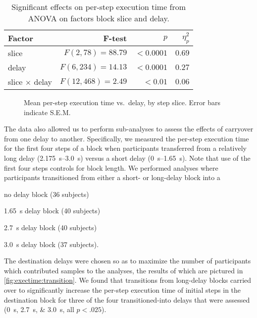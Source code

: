 \documentclass[10pt,letterpaper]{article}
\begin{document}
\begin{table}[h]
  \centering
  \caption{Significant effects on per-step execution time from ANOVA on factors block slice and delay.}\label{tab:anova:exectime:slice}
  \setlength{\tabcolsep}{0pt} %
  \begin{tabular*}{\columnwidth}{@{\extracolsep{\fill}\quad}lrrr@{}}
    \toprule
    \textbf{Factor} & \textbf{F-test} & \( p \) & \( \eta^{2}_{p} \) \\
    \midrule
    slice         &   \( F(2, 78) = 88.79 \) &  \( < 0.0001 \) &         \( 0.69 \) \\
    delay         &  \( F(6, 234) = 14.13 \) &  \( < 0.0001 \) &         \( 0.27 \) \\
    slice \( \times \) delay &  \( F(12, 468) = 2.49 \) &    \( < 0.01 \) &         \( 0.06 \) \\
    \bottomrule
  \end{tabular*}%
\end{table}

\begin{figure}[h]
    \centering
    \caption{Mean per-step execution time vs.\ delay, by step slice.
    Error bars indicate S.E.M.}
    \label{fig:exectime:delay:slice}
\end{figure}

The data also allowed us to perform sub-analyses to assess the effects of carryover from one delay to another.
Specifically, we measured the per-step execution time for the first four steps of a block when participants transferred from a relatively long delay (\SIrange{2.175}{3.0}{\second}) versus a short delay (\SIrange{0}{1.65}{\second}).
Note that use of the first four steps controls for block length.
We performed analyses where participants transitioned from either a short- or long-delay block into a
\begin{enumerate*}[label=(\roman*), before=\unskip{: }, itemjoin={{; }}, itemjoin*={{; and }}]
  \item no delay block (36 subjects)
  \item \SI{1.65}{\second} delay block (40 subjects)
  \item \SI{2.7}{\second} delay block (40 subjects)
  \item \SI{3.0}{\second} delay block (37 subjects).
\end{enumerate*}
The destination delays were chosen so as to maximize the number of participants which contributed samples to the analyses, the results of which are pictured in \cref{fig:exectime:transition}.
We found that transitions from long-delay blocks carried over to significantly increase the per-step execution time of initial steps in the destination block for three of the four transitioned-into delays that were assessed (\SIlist{0;2.7;3.0}{\second}, all \( p < .025\)).
\end{document}
